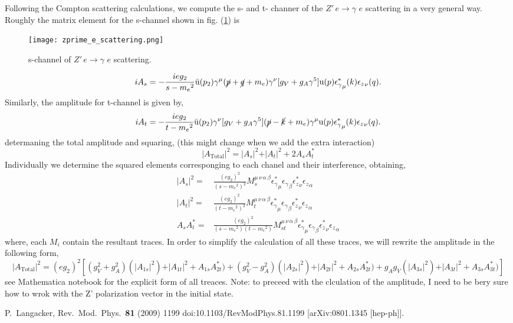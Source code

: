\documentclass[amssymb,useAMS,prd,aps,amsmath,onecolumn,superscriptaddress,nofootinbib]{revtex4}
\def\me{{m_e}}
\def\g{{\gamma}}
\def\epsg{{\epsilon_\gamma}}
\def\cepsg{{\epsilon_\gamma^*}}
\def\epsz{{\epsilon_z}}
\def\cepsz{{\epsilon_z^*}}
\def\vp{{\mathrm{u}(p)}}
\def\bup2{{\bar{\mathrm{u}}(p_2)}}
\def\kslash{{\cancel{k}}}
\def\qslash{{\cancel{q}}}
\def\pslash{{\cancel{p}}}
\begin{document}
 Following the Compton scattering calculations, we compute the s- and t- channer  of the $Z' \,e\rightarrow \gamma\,\, e$  scattering in a very general way. Roughly the matrix element for the s-channel shown in fig. (\ref{s-channel_scattering}) is 
\begin{figure}
\texttt{[image: zprime\_e\_scattering.png]}
\caption{s-channel of $Z' \,e\rightarrow \gamma\,\, e$ scattering.}\label{s-channel_scattering}
\end{figure}
\begin{equation}
iA_s=-\frac{ieg_2}{s-\me^2}\bup2\g^\mu(\pslash+\qslash+\me)\g^\nu[g_V+g_A\g^5]\vp\cepsg_\mu(k)\epsz_\nu(q).
\end{equation}
Similarly, the amplitude for t-channel is given by,
\begin{equation}
iA_t=-\frac{ieg_2}{t-\me^2}\bup2\g^\nu[g_V+g_A\g^5](\pslash-\kslash+\me)\g^\mu\vp\cepsg_\mu(k)\epsz_\nu(q).
\end{equation}
determaning the total amplitude and squaring, (this might change when we add the extra interaction)
\begin{equation}
\vert A_\mathrm{Total}\vert^2=\vert A_{s}\vert^2+\vert A_{t}\vert^2+2 A_{s}A_t^*
\end{equation}
Individually we determine the squared elements corresponging to each chanel and their interference, obtaining,
\begin{align*}
\vert A_s\vert^2=&\frac{(eg_2)^2}{(s-\me^2)^2}M_s^{\mu\,\nu\,\alpha\,\beta}\cepsg_\mu\epsg_\beta\cepsz_\nu\epsz_\alpha\\
\vert A_t\vert^2=&\frac{(eg_2)^2}{(t-\me^2)^2}M_t^{\mu\,\nu\,\alpha\,\beta}\cepsg_\mu\epsg_\beta\cepsz_\nu\epsz_\alpha\\
 A_sA_t^*=&\frac{(eg_2)^2}{(s-\me^2)(t-\me^2)}M_{st}^{\mu\,\nu\,\alpha\,\beta}\cepsg_\mu\epsg_\beta\cepsz_\nu\epsz_\alpha
\end{align*}
where, each $M_i$ contain the resultant traces. In order to simplify the calculation of all these traces, we will rewrite the amplitude in the following form, 
\begin{equation}
\vert A_\mathrm{Total}\vert^2=(eg_2)^2[(g_V^2+g_A^2)(\vert A_{1s}\vert^2)+\vert A_{1t}\vert^2+A_{1s}A_{2t}^*)+(g_V^2-g_A^2)(\vert A_{2s}\vert^2)+\vert A_{2t}\vert^2+A_{2s}A_{2t}^*)+g_Ag_V(\vert A_{3s}\vert^2)+\vert A_{3t}\vert^2+A_{3s}A_{3t}^*)]
\end{equation}
see Mathematica notebook for the explicit form of all treaces. 
Note: to preceed with the clculation of the amplitude, I need to be bery sure how to wrok with the Z' polarization vector in the initial state. 

\begin{thebibliography}{9}
  P.~Langacker,
  Rev.\ Mod.\ Phys.\  {\bf 81} (2009) 1199
  doi:10.1103/RevModPhys.81.1199
  [arXiv:0801.1345 [hep-ph]].
\end{thebibliography}
\end{document}
